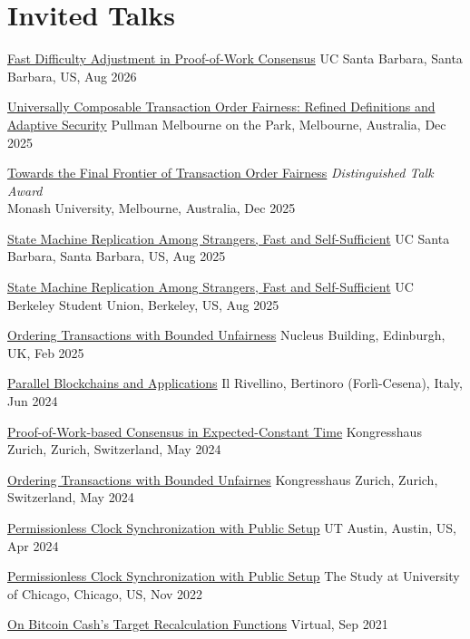 \section{Invited Talks}

{\href{https://crypto.iacr.org/2026/program.php}{Fast Difficulty Adjustment in Proof-of-Work Consensus}}
{}
{}
{}
{UC Santa Barbara, Santa Barbara, US, Aug 2026}

{\href{https://asiacrypt.iacr.org/2025/program.php}{Universally Composable Transaction Order Fairness: Refined Definitions and Adaptive Security}}
{}
{}
{}
{Pullman Melbourne on the Park, Melbourne, Australia, Dec 2025}

{\href{https://crwa.site/program/}{Towards the Final Frontier of Transaction Order Fairness}}
{}
{}
{}
{\emph{Distinguished Talk Award}\\Monash University, Melbourne, Australia, Dec 2025}

{\href{https://crypto.iacr.org/2025/program.php}{State Machine Replication Among Strangers, Fast and Self-Sufficient}}
{}
{}
{}
{UC Santa Barbara, Santa Barbara, US, Aug 2025}

{\href{https://youtu.be/CkU-Wz0YOuY?t=8010}{State Machine Replication Among Strangers, Fast and Self-Sufficient}}
{}
{}
{}
{UC Berkeley Student Union, Berkeley, US, Aug 2025}

{\href{https://typesig.pl/tuples2025/}{Ordering Transactions with Bounded Unfairness}}
{}
{}
{}
{Nucleus Building, Edinburgh, UK, Feb 2025}

{\href{https://cibe24.bici.events/home}{Parallel Blockchains and Applications}}
{}
{}
{}
{Il Rivellino, Bertinoro (Forlì-Cesena), Italy, Jun 2024}

{\href{https://youtu.be/uvAEvkGZymg?t=2400}{Proof-of-Work-based Consensus in Expected-Constant Time}}
{}
{}
{}
{Kongresshaus Zurich, Zurich, Switzerland, May 2024}

{\href{https://youtu.be/uvAEvkGZymg}{Ordering Transactions with Bounded Unfairnes}}
{}
{}
{}
{Kongresshaus Zurich, Zurich, Switzerland, May 2024}

{\href{https://texascryptoday.github.io/events/2-UTAustin.html}{Permissionless Clock Synchronization with Public Setup}}
{}
{}
{}
{UT Austin, Austin, US, Apr 2024}

{\href{https://youtu.be/JUYzY-1mcYM}{Permissionless Clock Synchronization with Public Setup}}
{}
{}
{}
{The Study at University of Chicago, Chicago, US, Nov 2022}

{{\href{https://youtu.be/5K6HNCtLPtk}{On Bitcoin Cash's Target Recalculation Functions}}}
{}
{}
{}
{Virtual, Sep 2021}